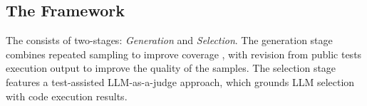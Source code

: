 
\subsection{The \frameworkname Framework}
The \frameworkname consists of two-stages: \emph{Generation}  and \emph{Selection}.
The generation stage combines repeated sampling to improve coverage%
, with revision from public tests execution output to
improve the quality of %
the samples. The selection stage features a test-assisted LLM-as-a-judge approach, which grounds LLM selection with code execution results.



